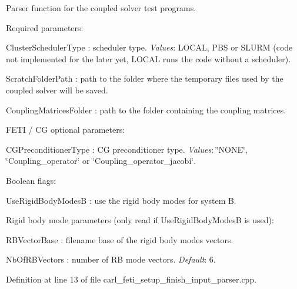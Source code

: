 Parser function for the coupled solver test programs. 

Required parameters\+:
\begin{DoxyItemize}
\item {\ttfamily Cluster\+Scheduler\+Type} \+: scheduler type. {\itshape Values}\+: L\+O\+C\+A\+L, P\+B\+S or S\+L\+U\+R\+M (code not implemented for the later yet, {\ttfamily L\+O\+C\+A\+L} runs the code without a scheduler).
\item {\ttfamily Scratch\+Folder\+Path} \+: path to the folder where the temporary files used by the coupled solver will be saved.
\item {\ttfamily Coupling\+Matrices\+Folder} \+: path to the folder containing the coupling matrices.
\end{DoxyItemize}

F\+E\+T\+I / C\+G optional parameters\+:
\begin{DoxyItemize}
\item {\ttfamily C\+G\+Preconditioner\+Type} \+: C\+G preconditioner type. {\itshape Values}\+: \char`\"{}\+N\+O\+N\+E\char`\"{}, \char`\"{}\+Coupling\+\_\+operator\char`\"{} or \char`\"{}\+Coupling\+\_\+operator\+\_\+jacobi\char`\"{}.
\end{DoxyItemize}

Boolean flags\+:
\begin{DoxyItemize}
\item {\ttfamily Use\+Rigid\+Body\+Modes\+B} \+: use the rigid body modes for system B.
\end{DoxyItemize}

Rigid body mode parameters (only read if {\ttfamily Use\+Rigid\+Body\+Modes\+B} is used)\+:
\begin{DoxyItemize}
\item {\ttfamily R\+B\+Vector\+Base} \+: filename base of the rigid body modes vectors.
\item {\ttfamily Nb\+Of\+R\+B\+Vectors} \+: number of R\+B mode vectors. {\itshape Default}\+: 6. 
\end{DoxyItemize}

Definition at line 13 of file carl\+\_\+feti\+\_\+setup\+\_\+finish\+\_\+input\+\_\+parser.\+cpp.


